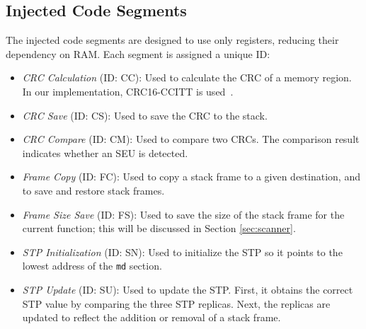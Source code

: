 \subsection{Injected Code Segments}
The injected code segments are designed to use only registers, reducing their dependency on RAM. Each segment is assigned a unique ID:
\begin{itemize} \itemsep 0in

\item \textit{CRC Calculation} (ID: CC): Used to calculate the CRC of a memory region. In our implementation, CRC16-CCITT is used~\cite{crc16}.

\item \textit{CRC Save} (ID: CS): Used to save the CRC to the stack.

\item \textit{CRC Compare} (ID: CM): Used to compare two CRCs. The comparison result indicates whether an SEU is detected.

\item \textit{Frame Copy} (ID: FC): Used to copy a stack frame to a given destination, and to save and restore stack frames.

\item \textit{Frame Size Save} (ID: FS): Used to save the size of the stack frame for the current function; this will be discussed in Section \ref{sec:scanner}.

\item \textit{STP Initialization} (ID: SN): Used to initialize the STP so it points to the lowest address of the \texttt{md} section.

\item \textit{STP Update} (ID: SU): Used to update the STP. First, it obtains the correct STP value by comparing the three STP replicas. Next, the replicas are updated to reflect the addition or removal of a stack frame.

\end{itemize}
